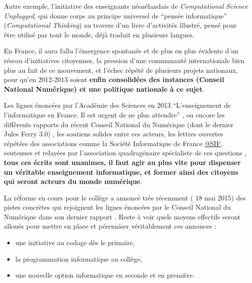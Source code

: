 Autre exemple, l'initiative des enseignants néozélandais de \textit{Computational Science Unplugged}, qui donne corps au principe universel de \enquote{pensée informatique} (\textit{Computational Thinking}) au travers d'un livre d'activités illustré, pensé pour être utilisé par tout le monde, déjà traduit en plusieurs langues.

En France, il aura fallu l'émergence spontanée et de plus en plus évidente d'un réseau d'initiatives citoyennes, la pression d'une communauté internationale bien plus au fait de ce mouvement, et l'échec répété de plusieurs projets nationaux, pour qu'en 2012-2013 soient \textbf{ enfin consolidées des instances (Conseil National Numérique) et une politique nationale à ce sujet}.

Les lignes énoncées par l'Académie des Sciences en 2013 \enquote{L’enseignement de l’informatique en France. Il est urgent de ne plus attendre} \autocite{AScience2013}, ou encore les différents rapports du récent Conseil National du Numérique (dont le dernier Jules Ferry 3.0) \autocite{CNNum2014}, les soutiens solides entre ces acteurs, les lettres ouvertes répétées des associations comme la Société Informatique de France \href{http://www.societe-informatique-de-france.fr/lettre-ouverte-a-monsieur-francois-hollande-president-de-la-republique-concernant-lenseignement-de-linformatique/lettre-ouverte-a-monsieur-francois-hollande-president-de-la-republique-concernant-lenseignement-de-linformatique-2/}{@SIF}, soutenues et relayées par l'association quadragénaire spécialiste de ces questions \textcite{EPI2014}, \textbf{tous ces écrits sont unanimes, il faut agir au plus vite pour dispenser un véritable enseignement informatique, et former ainsi des citoyens qui seront acteurs du monde numérique}.

La réforme en cours pour le collège a annoncé très récemment (\autocite{SIF2015} 18 mai 2015) des pistes concrètes qui rejoignent les lignes énoncées par le Conseil National du Numérique dans son dernier rapport \autocite{CNNum2014}. Reste à voir quels moyens effectifs seront alloués pour mettre en place et pérenniser véritablement ces annonces :
\begin{itemize}[label=\textbullet]
\item une initiative au codage dès le primaire,
\item la programmation informatique au collège,
\item une nouvelle option informatique en seconde et en première.
\end{itemize}

